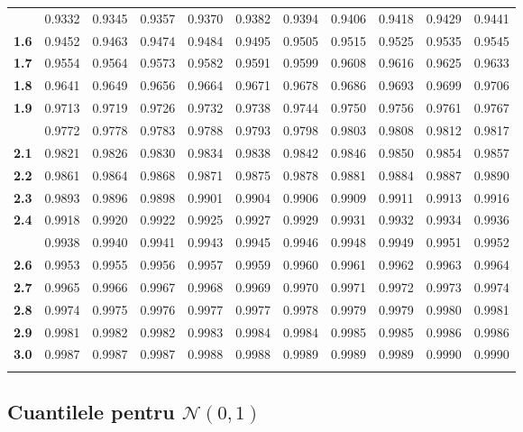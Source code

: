 \documentclass[]{article}
\begin{document}
\begin{longtable}{>{\bfseries}r|rrrrrrrrrr}
\addlinespace
1.5 & 0.9332 & 0.9345 & 0.9357 & 0.9370 & 0.9382 & 0.9394 & 0.9406 & 0.9418 & 0.9429 & 0.9441\\
1.6 & 0.9452 & 0.9463 & 0.9474 & 0.9484 & 0.9495 & 0.9505 & 0.9515 & 0.9525 & 0.9535 & 0.9545\\
1.7 & 0.9554 & 0.9564 & 0.9573 & 0.9582 & 0.9591 & 0.9599 & 0.9608 & 0.9616 & 0.9625 & 0.9633\\
1.8 & 0.9641 & 0.9649 & 0.9656 & 0.9664 & 0.9671 & 0.9678 & 0.9686 & 0.9693 & 0.9699 & 0.9706\\
1.9 & 0.9713 & 0.9719 & 0.9726 & 0.9732 & 0.9738 & 0.9744 & 0.9750 & 0.9756 & 0.9761 & 0.9767\\
\addlinespace
2.0 & 0.9772 & 0.9778 & 0.9783 & 0.9788 & 0.9793 & 0.9798 & 0.9803 & 0.9808 & 0.9812 & 0.9817\\
2.1 & 0.9821 & 0.9826 & 0.9830 & 0.9834 & 0.9838 & 0.9842 & 0.9846 & 0.9850 & 0.9854 & 0.9857\\
2.2 & 0.9861 & 0.9864 & 0.9868 & 0.9871 & 0.9875 & 0.9878 & 0.9881 & 0.9884 & 0.9887 & 0.9890\\
2.3 & 0.9893 & 0.9896 & 0.9898 & 0.9901 & 0.9904 & 0.9906 & 0.9909 & 0.9911 & 0.9913 & 0.9916\\
2.4 & 0.9918 & 0.9920 & 0.9922 & 0.9925 & 0.9927 & 0.9929 & 0.9931 & 0.9932 & 0.9934 & 0.9936\\
\addlinespace
2.5 & 0.9938 & 0.9940 & 0.9941 & 0.9943 & 0.9945 & 0.9946 & 0.9948 & 0.9949 & 0.9951 & 0.9952\\
2.6 & 0.9953 & 0.9955 & 0.9956 & 0.9957 & 0.9959 & 0.9960 & 0.9961 & 0.9962 & 0.9963 & 0.9964\\
2.7 & 0.9965 & 0.9966 & 0.9967 & 0.9968 & 0.9969 & 0.9970 & 0.9971 & 0.9972 & 0.9973 & 0.9974\\
2.8 & 0.9974 & 0.9975 & 0.9976 & 0.9977 & 0.9977 & 0.9978 & 0.9979 & 0.9979 & 0.9980 & 0.9981\\
2.9 & 0.9981 & 0.9982 & 0.9982 & 0.9983 & 0.9984 & 0.9984 & 0.9985 & 0.9985 & 0.9986 & 0.9986\\
3.0 & 0.9987 & 0.9987 & 0.9987 & 0.9988 & 0.9988 & 0.9989 & 0.9989 & 0.9989 & 0.9990 & 0.9990\\*
\end{longtable}

\endgroup{}

\subsection{\texorpdfstring{Cuantilele pentru
\(\mathcal{N}(0,1)\)}{Cuantilele pentru \textbackslash{}mathcal\{N\}(0,1)}}\label{cuantilele-pentru-mathcaln01}
\end{document}
